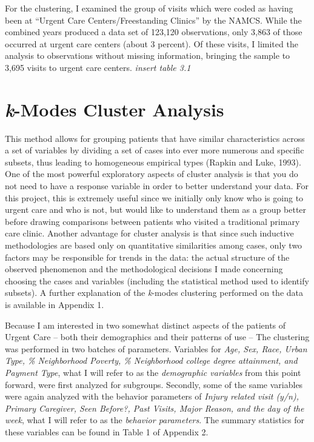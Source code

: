 \documentclass[12pt,twoside]{reedthesis}
\begin{document}
  For the clustering, I examined the group of visits which were coded as
  having been at ``Urgent Care Centers/Freestanding Clinics'' by the
  NAMCS. While the combined years produced a data set of 123,120
  observations, only 3,863 of those occurred at urgent care centers (about
  3 percent). Of these visits, I limited the analysis to observations
  without missing information, bringing the sample to 3,695 visits to
  urgent care centers. \emph{insert table 3.1}
  
  \section*{\texorpdfstring{\emph{k}-Modes Cluster
  Analysis}{k-Modes Cluster Analysis}}\label{k-modes-cluster-analysis}
  
  This method allows for grouping patients that have similar
  characteristics across a set of variables by dividing a set of cases
  into ever more numerous and specific subsets, thus leading to
  homogeneous empirical types (Rapkin and Luke, 1993). One of the most
  powerful exploratory aspects of cluster analysis is that you do not need
  to have a response variable in order to better understand your data. For
  this project, this is extremely useful since we initially only know who
  is going to urgent care and who is not, but would like to understand
  them as a group better before drawing comparisons between patients who
  visited a traditional primary care clinic. Another advantage for cluster
  analysis is that since such inductive methodologies are based only on
  quantitative similarities among cases, only two factors may be
  responsible for trends in the data: the actual structure of the observed
  phenomenon and the methodological decisions I made concerning choosing
  the cases and variables (including the statistical method used to
  identify subsets). A further explanation of the \emph{k}-modes
  clustering performed on the data is available in Appendix 1.
  
  Because I am interested in two somewhat distinct aspects of the patients
  of Urgent Care -- both their demographics and their patterns of use --
  The clustering was performed in two batches of parameters. Variables for
  \emph{Age, Sex, Race, Urban Type, \% Neighborhood Poverty, \%
  Neighborhood college degree attainment, and Payment Type}, what I will
  refer to as the \emph{demographic variables} from this point forward,
  were first analyzed for subgroups. Secondly, some of the same variables
  were again analyzed with the behavior parameters of \emph{Injury related
  visit (y/n), Primary Caregiver, Seen Before?, Past Visits, Major Reason,
  and the day of the week}, what I will refer to as the \emph{behavior
  parameters}. The summary statistics for these variables can be found in
  Table 1 of Appendix 2.
  
\end{document}
